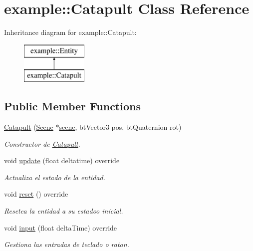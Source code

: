 \hypertarget{classexample_1_1_catapult}{}\section{example\+::Catapult Class Reference}
\label{classexample_1_1_catapult}
Inheritance diagram for example\+::Catapult\+:\begin{figure}[H]
\begin{center}
\leavevmode
\includegraphics[height=2.000000cm]{classexample_1_1_catapult}
\end{center}
\end{figure}
\subsection*{Public Member Functions}
\begin{DoxyCompactItemize}
\item 
\mbox{\hyperlink{classexample_1_1_catapult_af5e3568fda6ce735932009ec02238e22}{Catapult}} (\mbox{\hyperlink{classexample_1_1_scene}{Scene}} $\ast$\mbox{\hyperlink{classexample_1_1_entity_ab851dbde4a16829f9fb77ab9a66b9f1e}{scene}}, bt\+Vector3 pos, bt\+Quaternion rot)
\begin{DoxyCompactList}\small\item\em Constructor de \mbox{\hyperlink{classexample_1_1_catapult}{Catapult}}. \end{DoxyCompactList}\item 
void \mbox{\hyperlink{classexample_1_1_catapult_a92d07b886ef107a18037b53476c27f69}{update}} (float deltatime) override
\begin{DoxyCompactList}\small\item\em Actualiza el estado de la entidad. \end{DoxyCompactList}\item 
void \mbox{\hyperlink{classexample_1_1_catapult_acbef58b1295f5ddfedd45d92bd6fbfcf}{reset}} () override
\begin{DoxyCompactList}\small\item\em Resetea la entidad a su estadoo inicial. \end{DoxyCompactList}\item 
void \mbox{\hyperlink{classexample_1_1_catapult_a8477e4faafca1a1113964dd01f476f57}{input}} (float delta\+Time) override
\begin{DoxyCompactList}\small\item\em Gestiona las entradas de teclado o raton. \end{DoxyCompactList}\end{DoxyCompactItemize}
